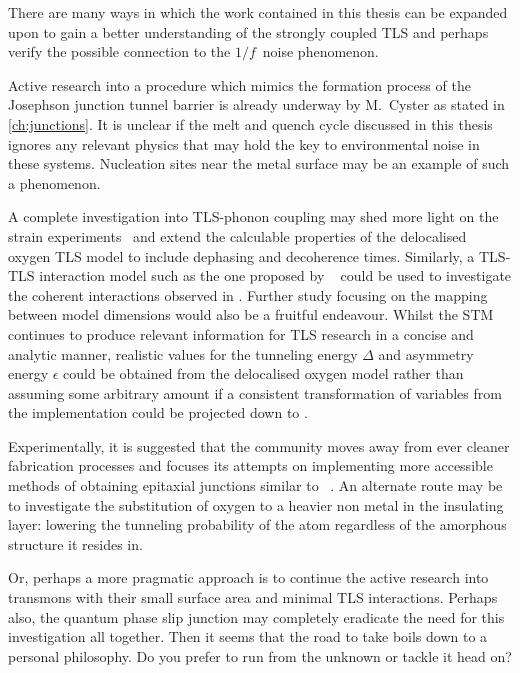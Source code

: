 \divtext

There are many ways in which the work contained in this thesis can be expanded upon to gain a better understanding of the strongly coupled TLS and perhaps verify the possible connection to the $1/f\,$ noise phenomenon.

Active research into a procedure which mimics the formation process of the Josephson junction tunnel barrier is already underway by M.~Cyster as stated in \cref{ch:junctions}.
It is unclear if the melt and quench cycle discussed in this thesis ignores any relevant physics that may hold the key to environmental noise in these systems.
Nucleation sites near the metal surface may be an example of such a phenomenon.

A complete investigation into TLS-phonon coupling may shed more light on the strain experiments~\cite{Grabovskij2012} and extend the calculable properties of the delocalised oxygen TLS model to include dephasing and decoherence times.
Similarly, a TLS-TLS interaction model such as the one proposed by \citeauthor{Faoro2014}~\cite{Faoro2014} could be used to investigate the coherent interactions observed in .
Further study focusing on the mapping between model dimensions would also be a fruitful endeavour.
Whilst the STM continues to produce relevant information for TLS research in a concise and analytic manner, realistic values for the tunneling energy $\Delta$ and asymmetry energy $\epsilon$ could be obtained from the delocalised oxygen model rather than assuming some arbitrary amount if a consistent transformation of variables from the  implementation could be projected down to .

Experimentally, it is suggested that the community moves away from ever cleaner fabrication processes and focuses its attempts on implementing more accessible methods of obtaining epitaxial junctions similar to \citeauthor{Oh2006}~\cite{Oh2006}.
An alternate route may be to investigate the substitution of oxygen to a heavier non metal in the insulating layer: lowering the tunneling probability of the atom regardless of the amorphous structure it resides in.

Or, perhaps a more pragmatic approach is to continue the active research into transmons with their small surface area and minimal TLS interactions.
Perhaps also, the quantum phase slip junction may completely eradicate the need for this investigation all together.
Then it seems that the road to take boils down to a personal philosophy.
Do you prefer to run from the unknown or tackle it head on?
\begin{center}
\resizebox{!}{1cm}{}
\end{center}
